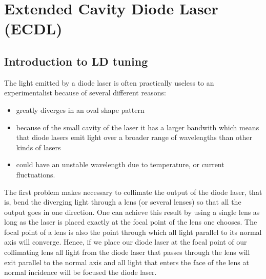 \chapter{Extended Cavity Diode Laser (ECDL)}\label{ECDL}
	\section{Introduction to LD tuning}

The light emitted by a diode laser is often practically useless to an experimentalist because of several different reasons:
\begin{itemize}
 \item greatly diverges in an oval shape pattern
 \item because of the small cavity of the laser it has a larger bandwith which means that diode lasers emit light over a broader range of wavelengths than other kinds of lasers
 \item could have an unstable wavelength due to temperature, or current fluctuations.
\end{itemize}

The first problem makes necessary to collimate the output of the diode laser, that is, bend the diverging light through a lens (or several lenses) so that all the output goes in one direction. One can achieve this result by using a single lens as long as the laser is placed exactly at the focal  point of the lens one chooses. The focal point of a lens is also the point through which all light parallel to its normal axis will converge. Hence, if we place our diode laser at the focal point of our collimating lens all light from the diode laser that passes through the lens will exit parallel to the normal axis and all light that enters the face of the lens at normal incidence will be focused the diode laser.

